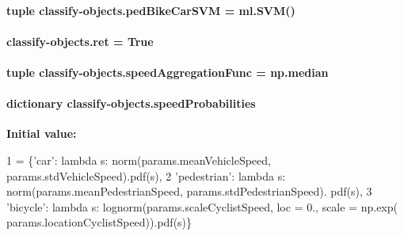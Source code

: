 \hypertarget{namespaceclassify-objects_ad8aa4cfa0495e4475a7a2783ab0cf6a2}{
\paragraph[{ped\-Bike\-Car\-S\-V\-M}]{\setlength{\rightskip}{0pt plus 5cm}tuple classify-\/objects.\-ped\-Bike\-Car\-S\-V\-M = {\bf ml.\-S\-V\-M}()}}\label{namespaceclassify-objects_ad8aa4cfa0495e4475a7a2783ab0cf6a2}
\hypertarget{namespaceclassify-objects_a67b10043840081536767e4c95033b1b0}{
\paragraph[{ret}]{\setlength{\rightskip}{0pt plus 5cm}classify-\/objects.\-ret = True}}\label{namespaceclassify-objects_a67b10043840081536767e4c95033b1b0}
\hypertarget{namespaceclassify-objects_aa9f837b583e87056a3b9f3fe05bf056c}{
\paragraph[{speed\-Aggregation\-Func}]{\setlength{\rightskip}{0pt plus 5cm}tuple classify-\/objects.\-speed\-Aggregation\-Func = np.\-median}}\label{namespaceclassify-objects_aa9f837b583e87056a3b9f3fe05bf056c}
\hypertarget{namespaceclassify-objects_a9d78ed6e8e795d4e3df3f3d99f8fbcfd}{
\paragraph[{speed\-Probabilities}]{\setlength{\rightskip}{0pt plus 5cm}dictionary classify-\/objects.\-speed\-Probabilities}}\label{namespaceclassify-objects_a9d78ed6e8e795d4e3df3f3d99f8fbcfd}
{\bfseries Initial value\-:}
\begin{DoxyCode}
1 = \{\textcolor{stringliteral}{'car'}: \textcolor{keyword}{lambda} s: norm(params.meanVehicleSpeed, params.stdVehicleSpeed).pdf(s),
2                       \textcolor{stringliteral}{'pedestrian'}: \textcolor{keyword}{lambda} s: norm(params.meanPedestrianSpeed, params.stdPedestrianSpeed).
      pdf(s), 
3                       \textcolor{stringliteral}{'bicycle'}: \textcolor{keyword}{lambda} s: lognorm(params.scaleCyclistSpeed, loc = 0., scale = np.exp(
      params.locationCyclistSpeed)).pdf(s)\}
\end{DoxyCode}
